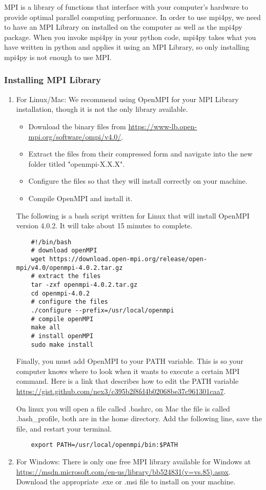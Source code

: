 MPI is a library of functions that interface with your computer's hardware to provide optimal parallel computing performance.
In order to use mpi4py, we need to have an MPI Library on installed on the computer as well as the mpi4py package.
When you invoke mpi4py in your python code, mpi4py takes what you have written in python and applies it using an MPI Library, so only installing mpi4py is not enough to use MPI.


\subsubsection*{Installing MPI Library}
\begin{enumerate}

\item For Linux/Mac:
We recommend using OpenMPI for your MPI Library installation, though it is not the only library available.
\begin{itemize}
    \item Download the binary files from \url{https://www-lb.open-mpi.org/software/ompi/v4.0/}.
    \item Extract the files from their compressed form and navigate into the new folder titled "openmpi-X.X.X".
    \item Configure the files so that they will install correctly on your machine.
    \item Compile OpenMPI and install it.
\end{itemize}

The following is a bash script written for Linux that will install OpenMPI version 4.0.2.
It will take about 15 minutes to complete.
\begin{lstlisting}
    #!/bin/bash
    # download openMPI
    wget https://download.open-mpi.org/release/open-mpi/v4.0/openmpi-4.0.2.tar.gz
    # extract the files
    tar -zxf openmpi-4.0.2.tar.gz
    cd openmpi-4.0.2
    # configure the files
    ./configure --prefix=/usr/local/openmpi
    # compile openMPI
    make all
    # install openMPI
    sudo make install
\end{lstlisting}

Finally, you must add OpenMPI to your PATH variable.
This is so your computer knows where to look when it wants to execute a certain MPI command.
Here is a link that describes how to edit the PATH variable \url{https://gist.github.com/nex3/c395b2f8fd4b02068be37c961301caa7}.

On linux you will open a file called .bashrc, on Mac the file is called .bash\_profile, both are in the home directory.
Add the following line, save the file, and restart your terminal.

\begin{lstlisting}
    export PATH=/usr/local/openmpi/bin:$PATH
\end{lstlisting}

\item For Windows:
There is only one free MPI library available for Windows at \url{https://msdn.microsoft.com/en-us/library/bb524831(v=vs.85).aspx}.
Download the appropriate .exe or .msi file to install on your machine.

\end{enumerate}


